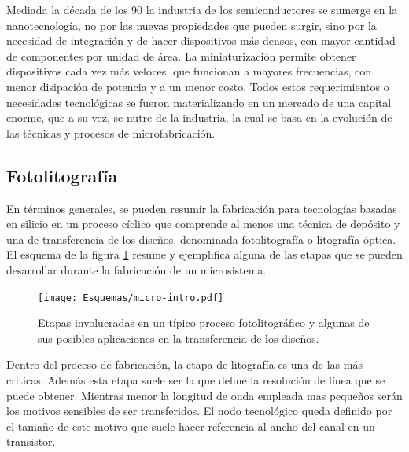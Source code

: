 		Mediada la década de los 90 la industria de los semiconductores se sumerge en la nanotecnología, no por las nuevas propiedades que pueden surgir, sino por la necesidad de integración y de hacer dispositivos más densos, con mayor cantidad de componentes por unidad de área. La miniaturización permite obtener dispositivos cada vez más  veloces, que funcionan a mayores frecuencias, con menor disipación de potencia y a un menor costo. Todos estos requerimientos o necesidades tecnológicas se fueron materializando en un mercado de una capital enorme, que a su vez, se nutre de la industria, la cual se basa en la evolución de las técnicas y procesos de microfabricación.

	\subsection{Fotolitografía}

		En términos generales, se pueden resumir la fabricación para tecnologías basadas en silicio en un proceso cíclico que comprende al menos una técnica de depósito y una de transferencia de los diseños, denominada fotolitografía o litografía óptica. El esquema de la figura \ref{fig:micro-intro} resume y ejemplifica alguna de las etapas que se pueden desarrollar durante la fabricación de un microsistema.
		
 			\begin{figure}[b!]
 				\begin{center}
 				\texttt{[image: Esquemas/micro-intro.pdf]}
 				\caption[Etapas de los procesos de microfabricación]{Etapas involucradas en un típico proceso fotolitográfico y algunas de sus posibles aplicaciones en la transferencia de los diseños.}
 		   		\label{fig:micro-intro}
 		    	\end{center}
 		    	\end{figure}

	
		Dentro del proceso de fabricación, la etapa de litografía es una de las más criticas. Además esta etapa suele ser la que define la resolución de línea que se puede obtener. Mientras menor la longitud de onda empleada mas pequeños serán los motivos sensibles de ser transferidos. El nodo tecnológico queda definido por el tamaño de este motivo que suele hacer referencia al ancho del canal en un transistor.

